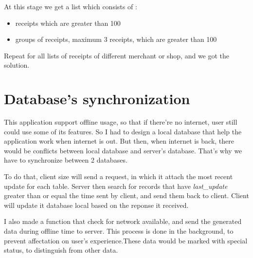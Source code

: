 At this stage we get a list which consists of :
\begin{itemize}
	\item receipts which are greater than 100
	\item groups of receipts, maximum 3 receipts, which are greater than 100
\end{itemize}

Repeat for all lists of receipts of different merchant or shop, and we got the solution.

\section{Database's synchronization}

This application support offline usage, so that if there're no internet, user still could use some of its features. So I had to design a local database that help the application work when internet is out. But then, when internet is back, there would be conflicts between local database and server's database. That's why we have to synchronize between 2 databases. 

To do that, client size will send a request, in which it attach the most recent update for each table. Server then search for records that have \textit{last\_update} greater than or equal the time sent by client, and send them back to client. Client will update it database local based on the reponse it received. 

I also made a function that check for network available, and send the generated data during offline time to server. This process is done in the background, to prevent affectation on user's experience.These data would be marked with special status, to distinguish from other data. 
